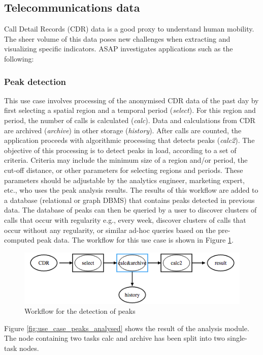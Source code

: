 \documentclass[12pt,openany,onecolumn]{book}
\begin{document}
\subsection{Telecommunications data}
Call Detail Records (CDR) data is a good proxy to understand human mobility. The sheer volume of this data poses new challenges when extracting and visualizing specific indicators. ASAP investigates applications such as the following:

\subsubsection{Peak detection}
This use case involves processing of the anonymised CDR data of the past day by first selecting a spatial region and a temporal period (\emph{select}). For this region and period, the number of calls is calculated (\emph{calc}). Data and calculations from CDR are archived (\emph{archive}) in other storage (\emph{history}). After calls are counted, the application proceeds with algorithmic processing that detects peaks (\emph{calc2}). The objective of this processing is to detect peaks in load, according to a set of criteria. Criteria may include the minimum size of a region and/or period, the cut-off distance, or other parameters for selecting regions and periods. These parameters should be adjustable by the analytics engineer, marketing expert, etc., who uses the peak analysis results. The results of this workflow are added to a database (relational or graph DBMS) that contains peaks detected in previous data. The database of peaks can then be queried by a user to discover clusters of calls that occur with regularity e.g., every week, discover clusters of calls that occur without any regularity, or similar ad-hoc queries based on the pre-computed peak data. The workflow for this use case is shown in Figure \ref{fig:use_case_peaks}.

\begin{figure}[h]
\centering
\includegraphics[scale=0.75]{figs/peakdetection}
\caption{Workflow for the detection of peaks}\label{fig:use_case_peaks}
\end{figure}

Figure \ref{fig:use_case_peaks_analysed} shows the result of the analysis module. The node containing two tasks calc and archive has been split into two single-task nodes.
\end{document}

